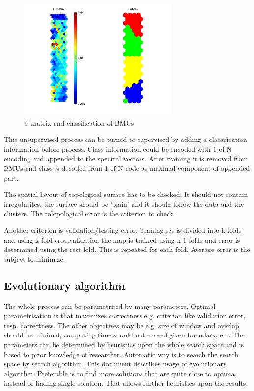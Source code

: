 \documentclass[a4paper,journal]{IEEEtran}
\begin{document}
\begin{figure}[h]
\centering
\includegraphics[width=80mm]{som_umat}
\caption{U-matrix and classification of BMUs}
\label{som_umat}
\end{figure}

This unsupervised process can be turned to supervised by adding a classification
information before process.
Class information  could be encoded with 1-of-N encoding and appended to the 
spectral vectors. After training it is removed from BMUs and class is 
decoded from 1-of-N code as maximal component of appended part.

The spatial 
layout of topological surface has to be checked. It should not contain irregularites, 
the surface should be 'plain' and it should follow the data and the clusters. 
The tolopological error is the criterion to check.

Another criterion is validation/testing error. Traning set is divided into k-folds
and using k-fold crossvalidation the map is trained using k-1 folds and  error 
is determined using the rest fold. This is repeated for each fold. Average error is 
the subject to minimize.


\subsection{Evolutionary algorithm}
The whole process can be parametrised by many parameters. Optimal parametrisation 
is that maximizes correctness e.g. criterion like validation error, resp. correctness.
The other objectives may be e.g. size of window and overlap
should be minimal, computing time should not exceed given boundary, etc.
The parameters can be determined by heuristics upon the whole search space and
is based to prior knowledge of researcher.
Automatic way is to search the search space by search algorithm. This document
describes usage of evolutionary algorithm.
Preferable is to find more solutions that are quite close to optima, instead of 
finding single solution. That allows further heuristics upon the results.
\end{document}
